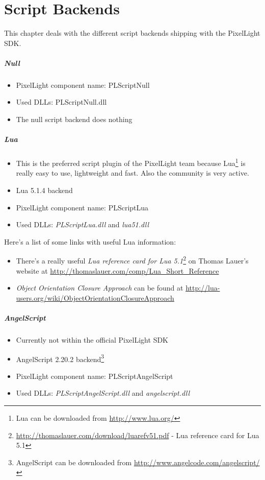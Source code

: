 \chapter{Script Backends}
This chapter deals with the different script backends shipping with the PixelLight \ac{SDK}.


\paragraph{Null}
\begin{itemize}
\item PixelLight component name: PLScriptNull
\item Used \ac{DLL}s: PLScriptNull.dll
\item The null script backend does nothing
\end{itemize}


\paragraph{Lua}
\begin{itemize}
\item This is the preferred script plugin of the PixelLight team because Lua\footnote{Lua can be downloaded from \url{http://www.lua.org/}} is really easy to use, lightweight and fast. Also the community is very active.
\item Lua 5.1.4 backend
\item PixelLight component name: PLScriptLua
\item Used \ac{DLL}s: \emph{PLScriptLua.dll} and \emph{lua51.dll}
\end{itemize}

Here's a list of some links with useful Lua information:
\begin{itemize}
\item There's a really useful \emph{Lua reference card for Lua 5.1}\footnote{\url{http://thomaslauer.com/download/luarefv51.pdf} - Lua reference card for Lua 5.1} on Thomas Lauer's website at \url{http://thomaslauer.com/comp/Lua_Short_Reference}
\item \emph{Object Orientation Closure Approach} can be found at \url{http://lua-users.org/wiki/ObjectOrientationClosureApproach}
\end{itemize}


\paragraph{AngelScript}
\begin{itemize}
\item Currently not within the official PixelLight \ac{SDK}
\item AngelScript 2.20.2 backend\footnote{AngelScript can be downloaded from \url{http://www.angelcode.com/angelscript/}}
\item PixelLight component name: PLScriptAngelScript
\item Used \ac{DLL}s: \emph{PLScriptAngelScript.dll} and \emph{angelscript.dll}
\end{itemize}


